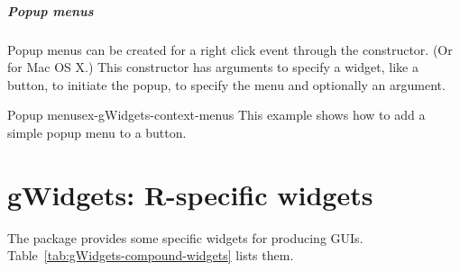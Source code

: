 \paragraph{Popup menus}

Popup menus can be created for a right click event through the
 constructor. (Or
 for Mac OS X.) This constructor has arguments
 to specify a widget, like a button, to initiate the popup,
 to specify the menu and optionally an
 argument.


\begin{example}{Popup menus}{ex-gWidgets-context-menus}
  This example shows how to add a simple popup menu to a button.
\begin{Schunk}
\end{Schunk}

\end{example}












\chapter{gWidgets: R-specific  widgets}
\label{cha:compound-widgets}
The  package provides some \R\/ specific widgets for
producing GUIs. Table~\ref{tab:gWidgets-compound-widgets} lists them.


